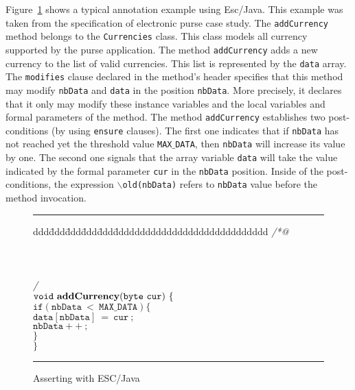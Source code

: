\documentclass[a4paper]{llncs}
\begin{document}
Figure~\ref{fig-add-cur} shows a typical annotation example using
Esc/Java. This example was taken from the specification of electronic
purse case study. The \texttt{addCurrency} method belongs to the
\texttt{Currencies} class. This class models all
currency supported by the purse application. The method
\texttt{addCurrency} adds a new currency to the list of valid
currencies. This list is represented by the
\texttt{data} array. The \texttt{modifies} clause declared in the
method's header specifies that
this method may modify \texttt{nbData} and
\texttt{data} in the position \texttt{nbData}. More precisely, it
declares that it only may modify these instance variables and the local
variables and formal parameters of the method. The method
\texttt{addCurrency} establishes
two post-conditions (by using \texttt{ensure} clauses). The first
one indicates that if \texttt{nbData} has not reached yet the threshold
value \texttt{MAX$\_$DATA}, then \texttt{nbData} will increase its
value by one. The second one signals
that the array variable \texttt{data} will take the value
indicated by the formal parameter \texttt{cur} in the \texttt{nbData}
position. Inside of the post-conditions, the expression
\texttt{$\backslash$old(nbData)} refers to \texttt{nbData} value
before the method invocation.

\begin{figure}[hbt]
\rule{\linewidth}{0.3mm}
\begin{tabbing}
ddd\=ddd\=ddd\=ddd\=ddd\=ddddddddddddddddddddddddddddd \kill
{\it /*@ } \\
 \\
 \\
 \\
{\it */ } \\
$\mathtt{void\ {\bf addCurrency}(byte\ cur)\ \{}$ \\
\>$\mathtt{if(nbData\ <\ MAX\_DATA) \{}$ \\
\>\>$\mathtt{data[nbData]\ =\ cur\ ;}$ \\
\>\>$\mathtt{nbData++\ ;}$ \\
\>$\mathtt{\}}$ \\
$\mathtt{\}}$ 
\end{tabbing}
\caption{Asserting with ESC/Java}
\label{fig-add-cur}
\rule{\linewidth}{0.3mm}
\end{figure}
\end{document}
